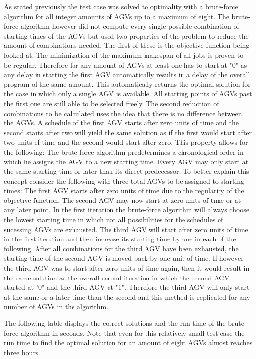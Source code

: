As stated previously the test case was solved to optimality with a brute-force algorithm for all integer amounts of AGVs up to a maximum of eight. The brute-force algorithm however did not compute every single possible combination of starting times of the AGVs but used two properties of the problem to reduce the amount of combinations needed. The first of these is the objective function being looked at: The minimization of the maximum makespan of all jobs is proven to be regular. Therefore for any amount of AGVs at least one has to start at "0" as any delay in starting the first AGV automatically results in a delay of the overall program of the same amount. This automatically returns the optimal solution for the case in which only a single AGV is available. All starting points of AGVs past the first one are still able to be selected freely. The second reduction of combinations to be calculated uses the idea that there is no difference between the AGVs. A schedule of the first AGV starts after zero units of time and the second starts after two will yield the same solution as if the first would start after two units of time and the second would start after zero. This property allows for the following: The brute-force algorithm predetermines a chronological order in which he assigns the AGV to a new starting time. Every AGV may only start at the same starting time or later than its direct predecessor. To better explain this concept consider the following with three total AGVs to be assigned to starting times: The first AGV starts after zero units of time due to the regularity of the objective function. The second AGV may now start at zero units of time or at any later point. In the first iteration the brute-force algorithm will always choose the lowest starting time in which not all possibilities for the schedules of sucessing AGVs are exhausted. The third AGV will start after zero units of time in the first iteration and then increase its starting time by one in each of the following. After all combinations for the third AGV have been exhausted, the starting time of the second AGV is moved back by one unit of time. If however the third AGV was to start after zero units of time again, then it would result in the same solution as the overall second iteration in which the second AGV started at "0" and the third AGV at "1". Therefore the third AGV will only start at the same or a later time than the second and this method is replicated for any number of AGVs in the algorithm.

The following table displays the correct solutions and the run time of the brute-force algorithm in seconds. Note that even for this relatively small test case the run time to find the optimal solution for an amount of eight AGVs almost reaches three hours.

